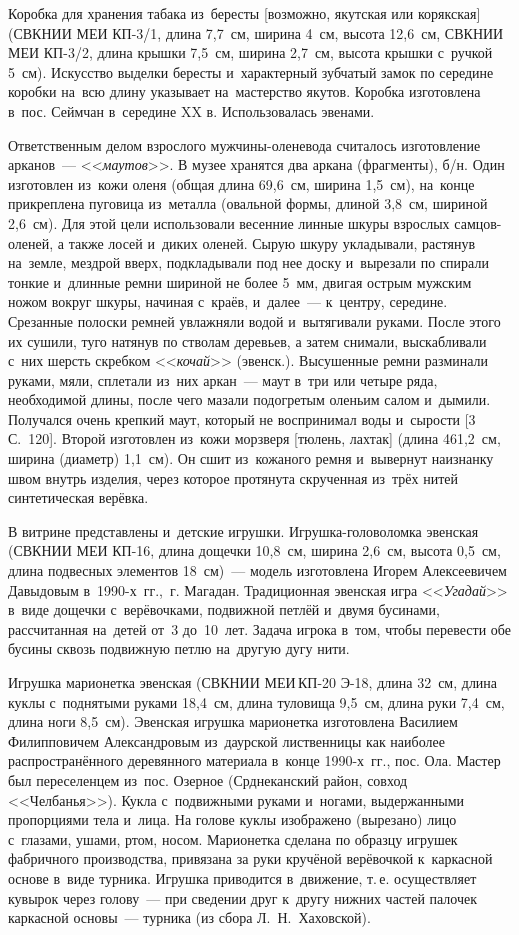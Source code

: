 Коробка для хранения табака из~бересты [возможно, якутская или корякская] (СВКНИИ МЕИ КП-3/1, длина 7,7~см, ширина 4~см, высота 12,6~см, СВКНИИ МЕИ КП-3/2, длина крышки 7,5~см, ширина 2,7~см, высота крышки с~ручкой 5~см). Искусство выделки бересты и~характерный зубчатый замок по середине коробки на~всю длину указывает на~мастерство якутов. Коробка изготовлена в~пос. Сеймчан в~середине XX в. Использовалась эвенами.

Ответственным делом взрослого мужчины-оленевода считалось изготовление арканов~--- <<\textit{маутов}>>. В музее хранятся два аркана (фрагменты), б/н. Один изготовлен из~кожи оленя (общая длина 69,6~см, ширина 1,5~см), на~конце прикреплена пуговица из~металла (овальной формы, длиной 3,8~см, шириной 2,6~см). Для этой цели использовали весенние линные шкуры взрослых самцов-оленей, а также лосей и~диких оленей. Сырую шкуру укладывали, растянув на~земле, мездрой вверх, подкладывали под нее доску и~вырезали по спирали тонкие и~длинные ремни шириной не более 5~мм, двигая острым мужским ножом вокруг шкуры, начиная с~краёв, и~далее~--- к~центру, середине. Срезанные полоски ремней увлажняли водой и~вытягивали руками. После этого их сушили, туго натянув по стволам деревьев, а затем снимали, выскабливали с~них шерсть скребком <<\textit{кочай}>> (эвенск.). Высушенные ремни разминали руками, мяли, сплетали из~них аркан~--- маут в~три или четыре ряда, необходимой длины, после чего мазали подогретым оленьим салом и~дымили. Получался очень крепкий маут, который не воспринимал воды и~сырости [3 С.~120]. Второй изготовлен из~кожи морзверя [тюлень, лахтак] (длина 461,2~см, ширина (диаметр) 1,1~см). Он сшит из~кожаного ремня и~вывернут наизнанку швом внутрь изделия, через которое протянута скрученная из~трёх нитей синтетическая верёвка.

В витрине представлены и~детские игрушки. Игрушка-головоломка эвенская (СВКНИИ МЕИ КП-16, длина дощечки 10,8~см, ширина 2,6~см, высота 0,5~см, длина подвесных элементов 18~см)~--- модель изготовлена Игорем Алексеевичем Давыдовым в~1990-х~гг.,~г. Магадан. Традиционная эвенская игра <<\textit{Угадай}>> в~виде дощечки с~верёвочками, подвижной петлёй и~двумя бусинами, рассчитанная на~детей от~3 до~10~лет. Задача игрока в~том, чтобы перевести обе бусины сквозь подвижную петлю на~другую дугу нити.

Игрушка марионетка эвенская (СВКНИИ МЕИ\,КП-20 Э-18, длина 32~см, длина куклы с~поднятыми руками 18,4~см, длина туловища 9,5~см, длина руки 7,4~см, длина ноги 8,5~см). Эвенская игрушка марионетка изготовлена Василием Филипповичем Александровым из~даурской лиственницы как наиболее распространённого деревянного материала в~конце 1990-х~гг., пос. Ола. Мастер был переселенцем из~пос. Озерное (Срднеканский район, совход <<Челбанья>>). Кукла с~подвижными руками и~ногами, выдержанными пропорциями тела и~лица. На голове куклы изображено (вырезано) лицо с~глазами, ушами, ртом, носом. Марионетка сделана по образцу игрушек фабричного производства, привязана за руки кручёной верёвочкой к~каркасной основе в~виде турника. Игрушка приводится в~движение, т.\,е. осуществляет кувырок через голову~--- при сведении друг к~другу нижних частей палочек каркасной основы~--- турника (из сбора Л.~Н.~Хаховской).

